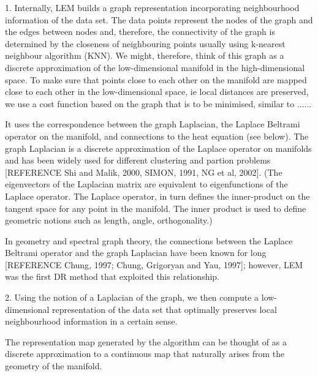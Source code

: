 \documentclass[journal, a4paper]{IEEEtran}
\begin{document}


1. Internally, LEM builds a graph representation incorporating neighbourhood information of the data set. The data points represent the nodes of the graph and the edges between nodes and, therefore, the connectivity of the graph is determined by the closeness of neighbouring points usually using k-nearest neighbour algorithm (KNN). We might, therefore, think of this graph as a discrete approximation of the low-dimensional manifold in the high-dimensional space. 
To make sure that points close to each other on the manifold are mapped close to each other in the low-dimensional space, ie local distances are preserved, we use a cost function based on the graph that is to be minimised, similar to ......

It uses the correspondence between the graph Laplacian, the Laplace Beltrami operator on the manifold, and connections to the heat equation (see below). The graph Laplacian is a discrete approximation of the Laplace operator on manifolds and has been widely used for different clustering and partion problems [REFERENCE Shi and Malik, 2000, SIMON, 1991, NG et al, 2002]. (The eigenvectors of the Laplacian matrix are equivalent to eigenfunctions of the Laplace operator. The Laplace operator, in turn defines the inner-product on the tangent space for any point in the manifold. The inner product is used to define geometric notions such as length, angle, orthogonality.)

In geometry and spectral graph theory, the connections between the Laplace Beltrami operator and the graph Laplacian have been known for long [REFERENCE Chung, 1997; Chung, Grigoryan and Yau, 1997]; however, LEM was the first DR method that exploited this relationship. 

2. Using the notion of a Laplacian of the graph, we then compute a low-dimensional representation of the data set that optimally preserves local neighbourhood information in a certain sense.

The representation map generated by the algorithm can be thought of as a discrete approximation to a continuous map that naturally arises from the geometry of the manifold.
\end{document}
